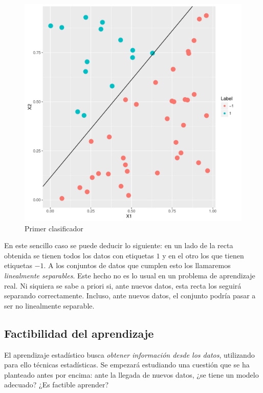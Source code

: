 \documentclass[a4paper,11pt]{book}\usepackage[]{graphicx}\usepackage[]{color}
\makeatletter
\def\maxwidth{ %
  \ifdim\Gin@nat@width>\linewidth
    \linewidth
  \else
    \Gin@nat@width
  \fi
}
\newenvironment{knitrout}{}{} %
\theoremstyle{plain}
\theoremstyle{definition}
\makeatother
\begin{document}
\begin{knitrout}
\color{fgcolor}\begin{figure}
\includegraphics[width=\maxwidth]{figure/classificationExample-1} \caption[Primer clasificador]{Primer clasificador}\label{fig:classificationExample}
\end{figure}


\end{knitrout}

En este sencillo caso se puede deducir lo siguiente: en un lado de la recta obtenida
se tienen todos los datos con etiquetas $1$ y en el otro los que tienen etiquetas $-1$.
A los conjuntos de datos que cumplen esto los llamaremos \emph{linealmente separables}.
Este hecho no es lo usual en un problema de aprendizaje real. Ni siquiera se sabe
a priori si, ante nuevos datos, esta recta los seguirá separando correctamente.
Incluso, ante nuevos datos, el conjunto podría pasar a ser no linealmente separable.

\subsection{Factibilidad del aprendizaje}

El aprendizaje estadístico busca \emph{obtener información desde los datos},
utilizando para ello técnicas estadísticas. Se empezará estudiando una cuestión
que se ha planteado antes por encima: ante la llegada de nuevos datos, ¿se tiene
un modelo adecuado? ¿Es factible aprender?
\end{document}
